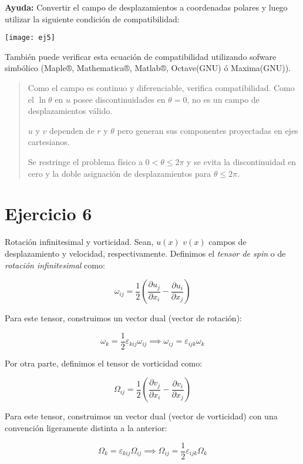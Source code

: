 \documentclass[a4paper,10pt,twoside,final,spanish]{article}
\begin{document}
\textbf{Ayuda:} Convertir el campo de desplazamientos a coordenadas polares y luego utilizar la siguiente condición de compatibilidad:

\centerline{\texttt{[image: ej5]}}

También puede verificar esta ecuación de compatibilidad utilizando sofware simbólico (Maple®, Mathematica®, Matlab®, Octave(GNU) ó Maxima(GNU)). 

\dotfill

\begin{quote}
Como el campo es continuo y diferenciable, verifica compatibilidad. Como el $\ln{\theta}$ en $u$ posee discontinuidades en $\theta=0$, no es un campo de desplazamientos válido.

$u$ y $v$ dependen de $r$ y $\theta$ pero generan sus componentes proyectadas en ejes cartesianos.

Se restringe el problema físico a $0<\theta\leq 2\pi$ y se evita la discontinuidad en cero y la doble asignación de desplazamientos para $\theta\leq 2\pi$.
\end{quote}

\section*{Ejercicio 6}

Rotación infinitesimal y vorticidad. Sean, $u(x)$ $v(x)$ campos de desplazamiento y velocidad, respectivamente. Definimos el \textit{tensor de spin} o de \textit{rotación infinitesimal} como:

\[
\omega_{ij}=\frac{1}{2}
\left(
\frac{\partial u_{j}}{\partial x_{i}}-\frac{\partial u_{i}}{\partial x_{j}}
\right)
\]
 
Para este tensor, construimos un vector dual (vector de rotación):

\begin{equation}
\omega_{k}=\frac{1}{2}\varepsilon_{kij}\omega_{ij} \implies
\omega_{ij}=\varepsilon_{ijk}\omega_{k}
\label{eq:eq1}
\end{equation}

Por otra parte, definimos el tensor de vorticidad como:

\[
\Omega_{ij}=\frac{1}{2}
\left(
\frac{\partial v_{j}}{\partial x_{i}}-\frac{\partial v_{i}}{\partial x_{j}}
\right)
\]
 
Para este tensor, construimos un vector dual (vector de vorticidad) con una convención 
ligeramente distinta a la anterior:
 
\begin{equation}
\Omega_{k}=\varepsilon_{kij}\Omega_{ij} \implies
\Omega_{ij}=\frac{1}{2}\varepsilon_{ijk}\Omega_{k}
\label{eq:eq2}
\end{equation}
 
\end{document}
